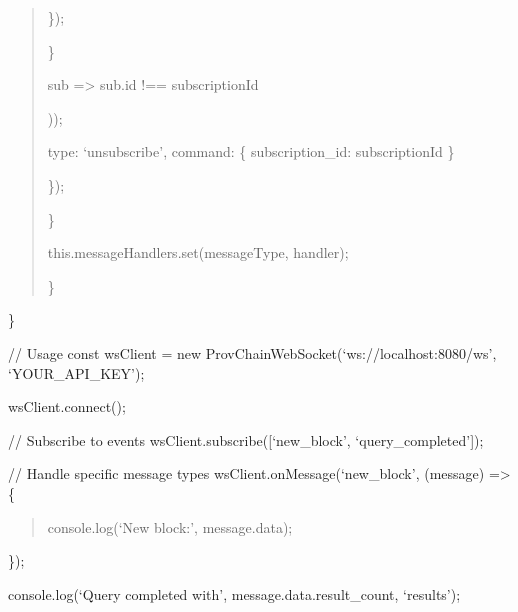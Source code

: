 \documentclass[letterpaper,10pt,english]{sphinxmanual}
\begin{document}
\begin{quote}
\begin{description}
\begin{description}
\end{description}

\sphinxAtStartPar
\});

\end{description}

\sphinxAtStartPar
\}
\begin{description}
\begin{description}
\sphinxAtStartPar
sub =\textgreater{} sub.id !== subscriptionId

\end{description}

\sphinxAtStartPar
));
\begin{description}
\sphinxAtStartPar
type: ‘unsubscribe’,
command: \{ subscription\_id: subscriptionId \}

\end{description}

\sphinxAtStartPar
\});

\end{description}

\sphinxAtStartPar
\}
\begin{description}
\sphinxAtStartPar
this.messageHandlers.set(messageType, handler);

\end{description}

\sphinxAtStartPar
\}
\end{quote}

\sphinxAtStartPar
\}

\sphinxAtStartPar
// Usage
const wsClient = new ProvChainWebSocket(‘ws://localhost:8080/ws’, ‘YOUR\_API\_KEY’);

\sphinxAtStartPar
wsClient.connect();

\sphinxAtStartPar
// Subscribe to events
wsClient.subscribe({[}‘new\_block’, ‘query\_completed’{]});

\sphinxAtStartPar
// Handle specific message types
wsClient.onMessage(‘new\_block’, (message) =\textgreater{} \{
\begin{quote}

\sphinxAtStartPar
console.log(‘New block:’, message.data);
\end{quote}

\sphinxAtStartPar
\});
\begin{description}
\sphinxAtStartPar
console.log(‘Query completed with’, message.data.result\_count, ‘results’);

\end{description}
\end{document}
